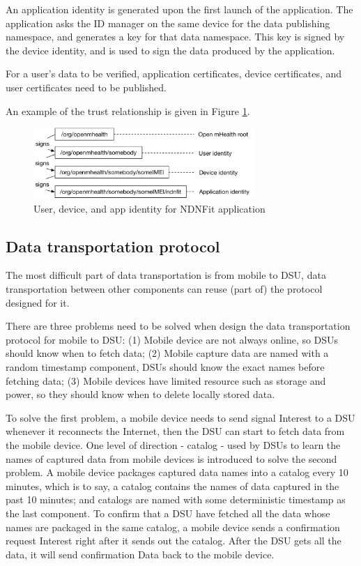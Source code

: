 \documentclass{article}
\begin{document}
An application identity is generated upon the first launch of the application. The application asks the ID manager on the same device for the data publishing namespace, and generates a key for that data namespace. This key is signed by the device identity, and is used to sign the data produced by the application.

For a user's data to be verified, application certificates, device certificates, and user certificates need to be published.

An example of the trust relationship is given in Figure \ref{fig:identity-manager}.

\begin{figure}
\begin{center}
\includegraphics[width=0.75\textwidth]{NDNFit-identity-example}
\caption{User, device, and app identity for NDNFit application}
\label{fig:identity-manager}
\end{center}
\end{figure}

\subsection{Data transportation protocol}
The most difficult part of data transportation is from mobile to DSU, data transportation between other components can reuse (part of) the protocol designed for it. 

There are three problems need to be solved when design the  data transportation protocol for mobile to DSU: (1) Mobile device are not always online, so DSUs should know when to fetch data; (2) Mobile capture data are named with a random timestamp component, DSUs should know the exact names before fetching data; (3) Mobile devices have limited resource such as storage and power, so they should know when to delete locally stored data.

To solve the first problem, a mobile device needs to send signal Interest to a DSU whenever it reconnects the Internet, then the DSU can start to fetch data from the mobile device.  One level of direction - catalog - used by DSUs to learn the names of captured data from mobile devices is introduced to solve the second problem. A mobile device packages captured data names into a catalog every 10 minutes, which is to say, a catalog contains the names of data captured in the past 10 minutes; and catalogs are named with some deterministic timestamp as the last component. To confirm that a DSU have fetched all the data whose names are packaged in the same catalog, a mobile device sends a confirmation request Interest right after it sends out the catalog. After the DSU gets all the data, it will send confirmation Data back to the mobile device. 
\end{document}
